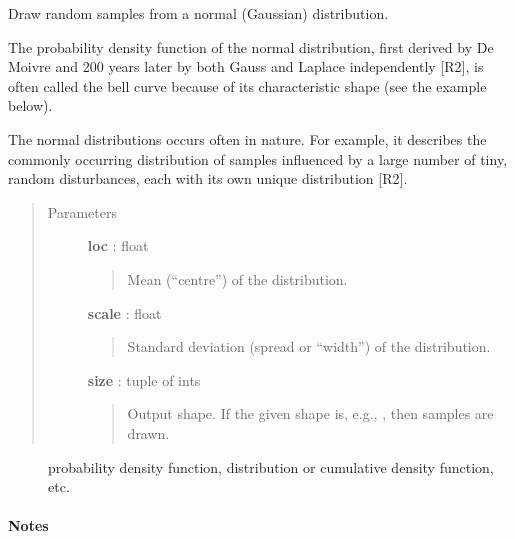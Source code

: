\documentclass[letterpaper,10pt,english]{sphinxmanual}
\begin{document}
\begin{fulllineitems}
\label{index:halla.normal}
Draw random samples from a normal (Gaussian) distribution.

The probability density function of the normal distribution, first
derived by De Moivre and 200 years later by both Gauss and Laplace
independently {[}R2{]}, is often called the bell curve because of
its characteristic shape (see the example below).

The normal distributions occurs often in nature.  For example, it
describes the commonly occurring distribution of samples influenced
by a large number of tiny, random disturbances, each with its own
unique distribution {[}R2{]}.
\begin{quote}\begin{description}
\item[{Parameters}] \leavevmode
\textbf{loc} : float
\begin{quote}

Mean (``centre'') of the distribution.
\end{quote}

\textbf{scale} : float
\begin{quote}

Standard deviation (spread or ``width'') of the distribution.
\end{quote}

\textbf{size} : tuple of ints
\begin{quote}

Output shape.  If the given shape is, e.g., , then
 samples are drawn.
\end{quote}

\end{description}\end{quote}



\begin{description}
\item[{}] \leavevmode
probability density function, distribution or cumulative density function, etc.

\end{description}


\paragraph{Notes}


\end{fulllineitems}
\end{document}
